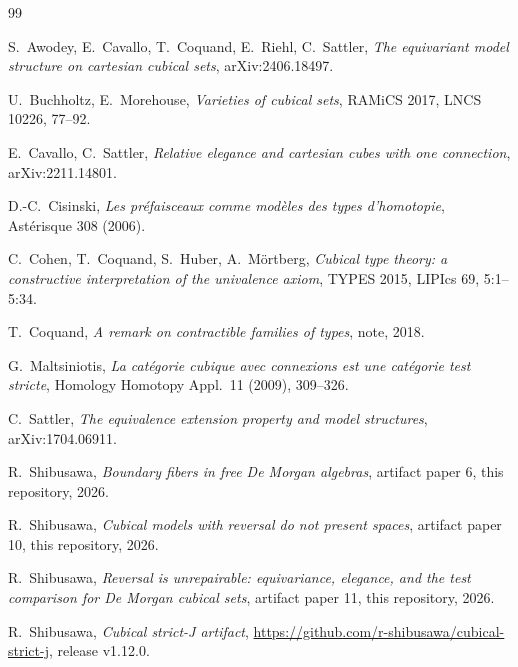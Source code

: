 \documentclass[11pt]{amsart}
\theoremstyle{definition}
\begin{document}
\begin{thebibliography}{99}

S.~Awodey, E.~Cavallo, T.~Coquand, E.~Riehl, C.~Sattler,
\emph{The equivariant model structure on cartesian cubical sets},
arXiv:2406.18497.

U.~Buchholtz, E.~Morehouse,
\emph{Varieties of cubical sets},
RAMiCS 2017, LNCS 10226, 77--92.

E.~Cavallo, C.~Sattler,
\emph{Relative elegance and cartesian cubes with one connection},
arXiv:2211.14801.

D.-C.~Cisinski,
\emph{Les pr\'efaisceaux comme mod\`eles des types d'homotopie},
Ast\'erisque 308 (2006).

C.~Cohen, T.~Coquand, S.~Huber, A.~M\"ortberg,
\emph{Cubical type theory: a constructive interpretation of the
  univalence axiom},
TYPES 2015, LIPIcs 69, 5:1--5:34.

T.~Coquand,
\emph{A remark on contractible families of types},
note, 2018.

G.~Maltsiniotis,
\emph{La cat\'egorie cubique avec connexions est une cat\'egorie
  test stricte},
Homology Homotopy Appl.\ 11 (2009), 309--326.

C.~Sattler,
\emph{The equivalence extension property and model structures},
arXiv:1704.06911.

R.~Shibusawa,
\emph{Boundary fibers in free De Morgan algebras},
artifact paper 6, this repository, 2026.

R.~Shibusawa,
\emph{Cubical models with reversal do not present spaces},
artifact paper 10, this repository, 2026.

R.~Shibusawa,
\emph{Reversal is unrepairable: equivariance, elegance, and the
  test comparison for De Morgan cubical sets},
artifact paper 11, this repository, 2026.

R.~Shibusawa,
\emph{Cubical strict-J artifact},
\url{https://github.com/r-shibusawa/cubical-strict-j},
release v1.12.0.

\end{thebibliography}
\end{document}
